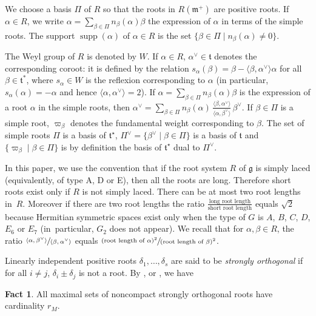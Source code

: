 \documentclass[JEP,XML,SOM,Unicode,NoFloatCountersInSection]{cedram}
\let\oldvee\vee
\renewcommand{\vee}{{\scriptscriptstyle\oldvee}}
\newcommand{\citestar}[3]{\cite[#3]{#1}}
\theoremstyle{plain}
\theoremstyle{definition}
\newtheorem{fact}[theo]{Fact}
\DeclareMathOperator{\supp}{supp}
\newcommand{\fgg}{\mathfrak{g}}
\newcommand{\fm}{\mathfrak{m}}
\newcommand{\ft}{\mathfrak{t}}
\newcommand{\rkm}{{r_M}}
\newcommand{\scal}[1]{\langle #1 \rangle}
\begin{document}
We choose a basis $\Pi$ of $R$ so that the roots in $R(\fm^+)$ are positive roots. If $\alpha\in R$, we
write $\alpha=\sum_{\beta\in\Pi}n_\beta(\alpha)\beta$ the expression of $\alpha$ in terms of the simple roots. The
support $\supp(\alpha)$ of $\alpha\in R$ is the set $\{\beta\in\Pi\mid n_\beta(\alpha)\neq 0\}$.

The Weyl group of $R$ is denoted by $W$. If $\alpha\in R$, $\alpha^\vee\in\ft$ denotes the corresponding
coroot: it is defined by the relation $s_\alpha(\beta)=\beta-\scal{\beta,\alpha^\vee}\alpha$ for all $\beta\in \ft^*$, where
$s_\alpha\in W$ is the reflexion corresponding to $\alpha$ (in particular, $s_\alpha(\alpha)=-\alpha$ and hence
$\scal{\alpha,\alpha^\vee}=2$). If $\alpha=\sum_{\beta\in\Pi}n_\beta(\alpha)\beta$ is the
expression of a root $\alpha$ in the simple roots, then $\alpha^\vee= \sum_{\beta\in\Pi}n_\beta(\alpha)\,
\frac{\scal{\beta,\alpha^\vee}}{\scal{\alpha,\beta^\vee}}\,\beta^\vee$.
If $\beta\in\Pi$ is a simple root, $\varpi_\beta$ denotes the
fundamental weight corresponding to $\beta$.
The set of simple roots $\Pi$ is a basis of $\ft^\star$,
$\Pi^\vee=\{\beta^\vee\mid\beta\in\Pi\}$ is a basis of $\ft$ and $\{\varpi_\beta\mid \beta\in\Pi\}$ is by
definition the basis of $\ft^\star$ dual to $\Pi^\vee$.

In this paper, we use the convention that if the root system $R$ of $\fgg$ is simply laced (equivalently,
of type A, D or E), then all
the roots are long. Therefore short roots exist only if $R$ is not simply laced. There can be at most
two root lengths in~$R$. Moreover if there are two root lengths the ratio
$\frac{\text{long
root length}}{\text{short root length}}$ equals $\sqrt{2}$ because Hermitian symmetric spaces exist
only when the type of $G$ is $A$, $B$, $C$, $D$, $E_6$ or $E_7$
(in~particular, $G_2$ does not appear). We recall that for $\alpha,\beta\in R$, the ratio
$\sfrac{\scal{\alpha,\beta^\vee}}{\scal{\beta,\alpha^\vee}}$ equals
$\sfrac{(\text{root length of }\alpha)^2}{(\text{root length of }\beta)^2}$.

Linearly independent positive
roots $\delta_1,\ldots, \delta_s$ are said to be \emph{strongly orthogonal} if for
all $i\neq j$, $\delta_i\pm \delta_j$ is not a root. By \cite{Harish}, or
\citestar{Helgason}*{Ch.\,VIII, }, we have

\begin{fact}\label{fact:maxstrong}
All maximal sets of noncompact strongly orthogonal roots have cardinality $\rkm$.
\end{fact}
\end{document}
